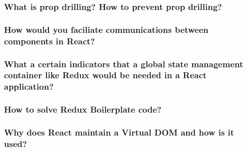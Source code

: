 \documentclass[12pt, a4paper]{article}
\begin{document}
\subsubsection*{What is prop drilling? How to prevent prop drilling?}
\subsubsection*{How would you faciliate communications between components in React?}
\subsubsection*{What a certain indicators that a global state management container like Redux would be needed in a React application?}
\subsubsection*{How to solve Redux Boilerplate code?}
\subsubsection*{Why does React maintain a Virtual DOM and how is it used?}
\end{document}
